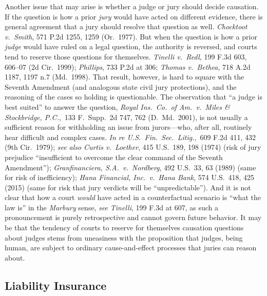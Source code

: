 \documentclass[
  12pt,
  letterpaper,
]{scrartcl}
\begin{document}
Another issue that may arise is whether a judge or jury should decide causation.
If the question is how a prior \textit{jury} would have acted on different evidence,
there is general agreement that a jury should resolve that question as well.
\textit{Chocktoot v.~Smith}, 571 P.2d 1255, 1259 (Or.~1977). But when the
question is how a prior \textit{judge} would have ruled on a legal question, the
authority is reversed, and courts tend to reserve those questions for
themselves. \textit{Tinelli v.~Redl}, 199 F.3d 603, 606--07 (2d Cir.~1999);
\textit{Phillips}, 733 P.2d at 306; \textit{Thomas v.~Bethea}, 718 A.2d 1187,
1197 n.7 (Md.~1998). That result, however, is hard to square with the Seventh Amendment (and analogous state civil jury protections), and the reasoning of the cases so holding is questionable. The observation that ``a judge is best suited'' to answer the question, \textit{Royal Ins.~Co.~of Am.~v.~Miles \& Stockbridge, P.C.},~133
F.~Supp.~2d 747, 762 (D.~Md.~2001), is not usually a sufficient reason for withholding
an issue from jurors---who, after all, routinely hear difficult and complex cases.
\textit{In re U.S.~Fin.~Sec.~Litig.},~609 F.2d 411, 432 (9th Cir.~1979);
\textit{see also} \textit{Curtis v.~Loether}, 415 U.S.~189, 198 (1974) (risk of
jury prejudice ``insufficient to overcome the clear command of the Seventh
Amendment''); \textit{Granfinanciera, S.A.~v.~Nordberg}, 492 U.S.~33, 63 (1989)
(same for risk of inefficiency); \textit{Hana Financial, Inc.~v.~Hana Bank},
574 U.S.~418, 425 (2015) (same for risk that jury verdicts will be
``unpredictable''). And it is not clear that how a court \emph{would} have
acted in a counterfactual scenario is ``what the law is'' in the
\textit{Marbury} sense, \textit{see} \textit{Tinelli}, 199 F.3d at 607, as such a pronouncement is purely
retrospective and cannot govern future behavior. It may be that the tendency of
courts to reserve for themselves causation questions about judges stems
from uneasiness with the proposition that judges, being human, are subject to ordinary
cause-and-effect processes that juries can reason about.


\subsection{Liability Insurance}
\end{document}
